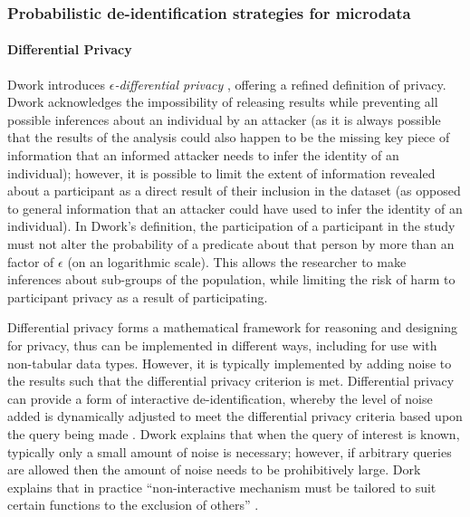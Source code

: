 \subsubsection{Probabilistic de-identification strategies for microdata}

\paragraph{Differential Privacy}


Dwork introduces \textit{$\epsilon$-differential privacy} \cite{Dwork2006}, offering a refined definition of privacy. Dwork acknowledges the impossibility of releasing results while preventing all possible inferences about an individual by an attacker (as it is always possible that the results of the analysis could also happen to be the missing key piece of information that an informed attacker needs to infer the identity of an individual); however, it is possible to limit the extent of information revealed about a participant as a direct result of their inclusion in the dataset (as opposed to general information that an attacker could have used to infer the identity of an individual). In Dwork's definition, the participation of a participant in the study must not alter the probability of a predicate about that person by more than an factor of \textit{$\epsilon$} (on an logarithmic scale). This allows the researcher to make inferences about sub-groups of the population, while limiting the risk of harm to participant privacy as a result of participating.

Differential privacy forms a mathematical framework for reasoning and designing for privacy, thus can be implemented in different ways, including for use with non-tabular data types. However, it is typically implemented by adding noise to the results such that the differential privacy criterion is met. Differential privacy can provide a form of interactive de-identification, whereby the level of noise added is dynamically adjusted to meet the differential privacy criteria based upon the query being made \cite{Dwork2016}. Dwork explains that when the query of interest is known, typically only a small amount of noise is necessary; however, if arbitrary queries are allowed then the amount of noise needs to be prohibitively large. Dork explains that in practice ``non-interactive mechanism must be tailored to suit certain functions to the exclusion of others'' \cite{Dwork2016}.

